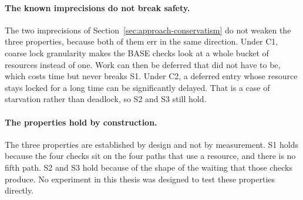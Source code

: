 \paragraph{The known imprecisions do not break safety.} The two imprecisions of
Section~\ref{sec:approach-conservatism} do not weaken the three properties,
because both of them err in the same direction. Under C1, coarse lock
granularity makes the BASE checks look at a whole bucket of resources instead of
one. Work can then be deferred that did not have to be, which costs time but
never breaks S1. Under C2, a deferred entry whose resource stays locked for a
long time can be significantly delayed. That is a case of starvation rather
than deadlock, so S2 and S3 still hold.

\paragraph{The properties hold by
  construction.}\label{sec:approach-safety-limits} The three properties are
established by design and not by measurement. S1 holds because the four
checks sit on the four paths that use a resource, and there is no fifth path. S2
and S3 hold because of the shape of the waiting that those checks produce. No
experiment in this thesis was designed to test these properties directly.

